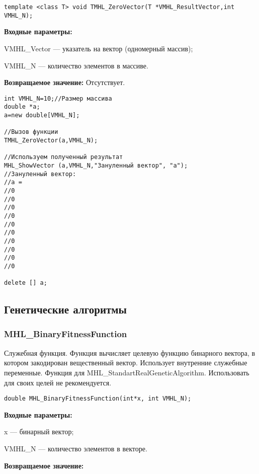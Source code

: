 \documentclass[a4paper,12pt]{article}
\begin{document}
\begin{lstlisting}[label=code_syntax_TMHL_ZeroVector,caption=Синтаксис]
template <class T> void TMHL_ZeroVector(T *VMHL_ResultVector,int VMHL_N);
\end{lstlisting}

\textbf{Входные параметры:}

 VMHL\_Vector --- указатель на вектор (одномерный массив);
 
 VMHL\_N --- количество элементов в массиве.

\textbf{Возвращаемое значение:}
Отсутствует.


\begin{lstlisting}[label=code_use_TMHL_ZeroVector,caption=Пример использования]
int VMHL_N=10;//Размер массива
double *a;
a=new double[VMHL_N];

//Вызов функции
TMHL_ZeroVector(a,VMHL_N);

//Используем полученный результат
MHL_ShowVector (a,VMHL_N,"Зануленный вектор", "a");
//Зануленный вектор:
//a =
//0
//0
//0
//0
//0
//0
//0
//0
//0
//0

delete [] a;
\end{lstlisting}

\subsection{Генетические алгоритмы}

\subsubsection{MHL\_BinaryFitnessFunction}\label{MHL_BinaryFitnessFunction}

Служебная функция. Функция вычисляет целевую функцию бинарного вектора, в котором закодирован вещественный вектор. Использует внутренние служебные переменные. Функция для MHL\_StandartRealGeneticAlgorithm. Использовать для своих целей не рекомендуется.


\begin{lstlisting}[label=code_syntax_MHL_BinaryFitnessFunction,caption=Синтаксис]
double MHL_BinaryFitnessFunction(int*x, int VMHL_N);
\end{lstlisting}

\textbf{Входные параметры:}
 
x --- бинарный вектор;

 VMHL\_N --- количество элементов в векторе.

\textbf{Возвращаемое значение:} 
\end{document}
